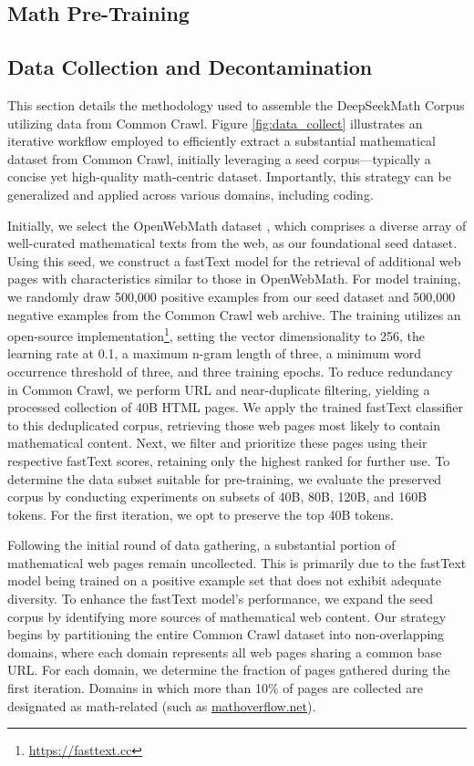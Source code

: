 \begin{itemize}[topsep=0pt]
\section{Math Pre-Training}

\subsection{Data Collection and Decontamination} 

This section details the methodology used to assemble the DeepSeekMath Corpus utilizing data from Common Crawl. Figure \ref{fig:data_collect} illustrates an iterative workflow employed to efficiently extract a substantial mathematical dataset from Common Crawl, initially leveraging a seed corpus—typically a concise yet high-quality math-centric dataset. Importantly, this strategy can be generalized and applied across various domains, including coding.

Initially, we select the OpenWebMath dataset \citep{openwebmath}, which comprises a diverse array of well-curated mathematical texts from the web, as our foundational seed dataset. Using this seed, we construct a fastText model \citep{joulin2016fasttext} for the retrieval of additional web pages with characteristics similar to those in OpenWebMath. For model training, we randomly draw 500,000 positive examples from our seed dataset and 500,000 negative examples from the Common Crawl web archive. The training utilizes an open-source implementation\footnote{\url{https://fasttext.cc}}, setting the vector dimensionality to 256, the learning rate at 0.1, a maximum n-gram length of three, a minimum word occurrence threshold of three, and three training epochs. To reduce redundancy in Common Crawl, we perform URL and near-duplicate filtering, yielding a processed collection of 40B HTML pages. We apply the trained fastText classifier to this deduplicated corpus, retrieving those web pages most likely to contain mathematical content. Next, we filter and prioritize these pages using their respective fastText scores, retaining only the highest ranked for further use. To determine the data subset suitable for pre-training, we evaluate the preserved corpus by conducting experiments on subsets of 40B, 80B, 120B, and 160B tokens. For the first iteration, we opt to preserve the top 40B tokens.

Following the initial round of data gathering, a substantial portion of mathematical web pages remain uncollected. This is primarily due to the fastText model being trained on a positive example set that does not exhibit adequate diversity. To enhance the fastText model's performance, we expand the seed corpus by identifying more sources of mathematical web content. Our strategy begins by partitioning the entire Common Crawl dataset into non-overlapping domains, where each domain represents all web pages sharing a common base URL. For each domain, we determine the fraction of pages gathered during the first iteration. Domains in which more than 10\% of pages are collected are designated as math-related (such as \url{mathoverflow.net}). 


\end{itemize}
